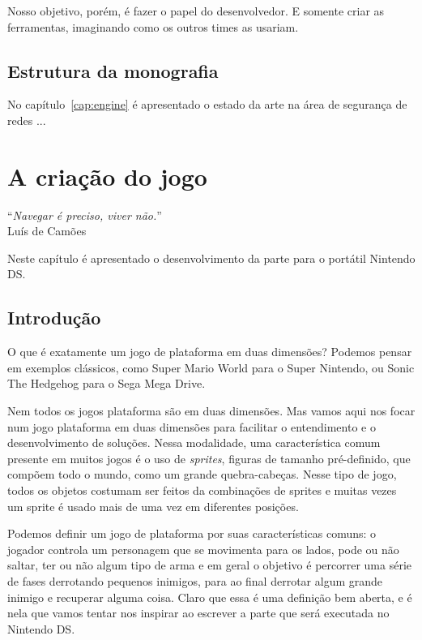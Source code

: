 \documentclass[brazil]{abnt}
\begin{document}
Nosso objetivo, porém, é fazer o papel do desenvolvedor. E somente criar as ferramentas, imaginando como os outros times as usariam.

\section{Estrutura da monografia}

No capítulo~\ref{cap:engine} é apresentado o estado da arte
na área de segurança de redes ...


\chapter{A criação do jogo\label{cap:engine}}

\vfill{}
\begin{flushright}{}``\emph{Navegar é preciso, viver não.}''\\
{\small Luís de Camões}\end{flushright}{\small \par}
\vfill{}

Neste capítulo é apresentado o desenvolvimento da parte para o portátil Nintendo DS.
\newpage


\section{Introdução}

O que é exatamente um jogo de plataforma em duas dimensões? Podemos pensar em exemplos clássicos, como Super Mario World para o Super Nintendo, ou Sonic The Hedgehog para o Sega Mega Drive.

Nem todos os jogos plataforma são em duas dimensões. Mas vamos aqui nos focar num jogo plataforma em duas dimensões para facilitar o entendimento e o desenvolvimento de soluções. Nessa modalidade, uma característica comum presente em muitos jogos é o uso de \textit{sprites}, figuras de tamanho pré-definido, que compõem todo o mundo, como um grande quebra-cabeças. Nesse tipo de jogo, todos os objetos costumam ser feitos da combinações de sprites e muitas vezes um sprite é usado mais de uma vez em diferentes posições.

Podemos definir um jogo de plataforma por suas características comuns: o jogador controla um personagem que se movimenta para os lados, pode ou não saltar, ter ou não algum tipo de arma e em geral o objetivo é percorrer uma série de fases derrotando pequenos inimigos, para ao final derrotar algum grande inimigo e recuperar alguma coisa. Claro que essa é uma definição bem aberta, e é nela que vamos tentar nos inspirar ao escrever a parte que será executada no Nintendo DS.
\end{document}

